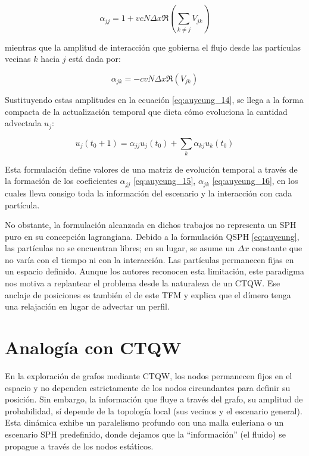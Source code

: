 \begin{equation}
    \alpha_{jj} = 1 + v c N \Delta x \Re(\sum_{k \neq j} V_{jk})
    \label{eq:auyeung_15}
\end{equation}

mientras que la amplitud de interacción que gobierna el flujo desde las partículas vecinas $k$ hacia $j$ está dada por:

\begin{equation}
  \alpha_{jk} = -c v N \Delta x \Re(V_{jk})
    \label{eq:auyeung_16}
\end{equation}

Sustituyendo estas amplitudes en la ecuación \eqref{eq:auyeung_14}, se llega a la forma compacta de la actualización temporal que dicta cómo evoluciona la cantidad advectada $u_j$:

\begin{equation}
    u_j(t_0+1) = \alpha_{jj} u_j(t_0) + \sum_{k} \alpha_{kj} u_k(t_0)
    \label{eq:auyeung_17}
\end{equation}

Esta formulación define valores de una matriz de evolución temporal a través de la formación de los coeficientes $\alpha_{jj}$ \eqref{eq:auyeung_15}, $\alpha_{jk}$ \eqref{eq:auyeung_16}, en los cuales lleva consigo toda la información del escenario y la interacción con cada partícula.

No obstante, la formulación alcanzada en dichos trabajos no representa un SPH puro en su concepción lagrangiana. Debido a la formulación QSPH \eqref{eq:auyeung}, las partículas no se encuentran libres; en su lugar, se asume un $\Delta x$ constante que no varía con el tiempo ni con la interacción. Las partículas permanecen fijas en un espacio definido. Aunque los autores reconocen esta limitación, este paradigma nos motiva a replantear el problema desde la naturaleza de un CTQW. Ese anclaje de posiciones es también el de este TFM y explica que el dímero tenga una relajación en lugar de advectar un perfil.


\section{Analogía con CTQW}
\label{subsec: analogía}

En la exploración de grafos mediante CTQW, los nodos permanecen fijos en el espacio y no dependen estrictamente de los nodos circundantes para definir su posición. Sin embargo, la información que fluye a través del grafo, su amplitud de probabilidad, sí depende de la topología local (sus vecinos y el escenario general). Esta dinámica exhibe un paralelismo profundo con una malla euleriana o un escenario SPH predefinido, donde dejamos que la ``información'' (el fluido) se propague a través de los nodos estáticos.

